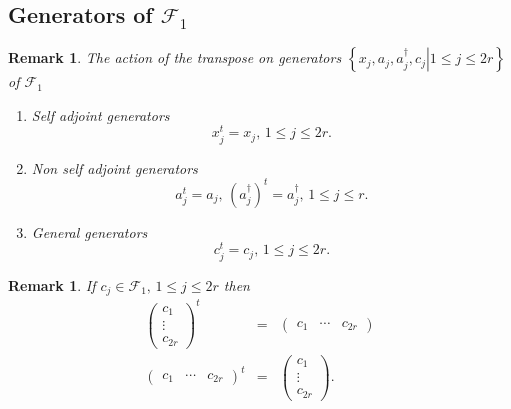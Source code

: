 \documentclass[aps,preprint]{revtex4}
\newtheorem{remark}[theorem]{Remark}
\begin{document}
\subsection{Generators of $\mathcal{F}_{1}$}

\begin{remark}
The action of the transpose on generators $\left\{ \left.
x_{j},a_{j},a_{j}^{\dagger },c_{j}\right\vert 1\leq j\leq 2r\right\} $ of $%
\mathcal{F}_{1}$

\begin{enumerate}
\item Self adjoint generators 
\begin{equation}
x_{j}^{t}=x_{j},\,1\leq j\leq 2r.
\end{equation}

\item Non self adjoint generators 
\begin{equation}
a_{j}^{t}=a_{j},\,\left( a_{j}^{\dagger }\right) ^{t}=a_{j}^{\dagger
},\,1\leq j\leq r.
\end{equation}

\item General generators 
\begin{equation}
c_{j}^{t}=c_{j},\,1\leq j\leq 2r.
\end{equation}
\end{enumerate}
\end{remark}

\begin{remark}
If $c_{j}\in \mathcal{F}_{1},\,1\leq j\leq 2r$ then 
\begin{eqnarray}
\left( 
\begin{array}{c}
c_{1} \\ 
\vdots \\ 
c_{2r}%
\end{array}%
\right) ^{t} &=&\left( 
\begin{array}{ccc}
c_{1} & \cdots & c_{2r}%
\end{array}%
\right) \\
\left( 
\begin{array}{ccc}
c_{1} & \cdots & c_{2r}%
\end{array}%
\right) ^{t} &=&\left( 
\begin{array}{c}
c_{1} \\ 
\vdots \\ 
c_{2r}%
\end{array}%
\right) .
\end{eqnarray}
\end{remark}
\end{document}
